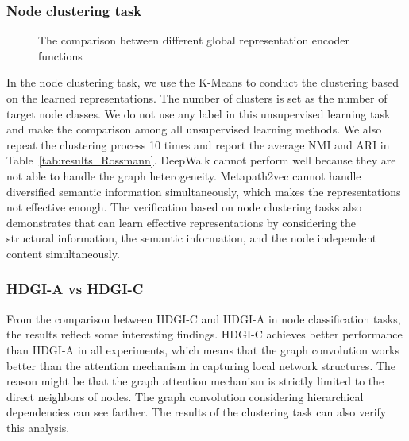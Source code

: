 \documentclass[conference]{IEEEtran}
\begin{document}
	\subsubsection{Node clustering task}
\begin{figure}[t]
\centering
{}
\caption{The comparison between different global representation encoder functions}\label{fig:global_function}
\end{figure}
In the node clustering task, we use the K-Means to conduct the clustering based on the learned representations. The number of clusters  is set as the number of target node classes. We do not use any label in this unsupervised learning task and make the comparison among all unsupervised learning methods. We also repeat the clustering process 10 times and report the average NMI and ARI in Table~\ref{tab:results_Rossmann}. DeepWalk cannot perform well because they are not able to handle the graph heterogeneity. Metapath2vec cannot handle diversified semantic information simultaneously, which makes the representations not effective enough. The verification based on node clustering tasks also demonstrates that {\our} can learn effective representations by considering the structural information, the semantic information, and the node independent content simultaneously.
	
\subsubsection{HDGI-A vs HDGI-C}
From the comparison between HDGI-C and HDGI-A in node classification tasks, the results reflect some interesting findings. HDGI-C achieves better performance than HDGI-A in all experiments, which means that the graph convolution works better than the attention mechanism in capturing local network structures. The reason might be that the graph attention mechanism is strictly limited to the direct neighbors of nodes. The graph convolution considering hierarchical dependencies can see farther. The results of the clustering task can also verify this analysis.
\end{document}
